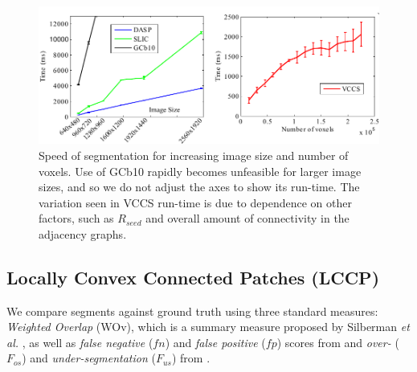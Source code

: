 \begin{figure}[t]
\begin{center}
\includegraphics[width=0.95\linewidth]{figures/CVPR2013/Speed.pdf}
\end{center}
   \caption[Segmentation Speed]{Speed of segmentation for increasing image size and number of voxels. Use of GCb10 rapidly becomes unfeasible for larger image sizes, and so we do not adjust the axes to show its run-time. The variation seen in VCCS run-time is due to dependence on other factors, such as ${R}_{seed}$ and overall amount of connectivity in the adjacency graphs.}
\label{fig:SegmentationSpeed}
\end{figure}

\subsection{Locally Convex Connected Patches (LCCP)}

We compare segments against ground truth using three standard measures: \textit{Weighted Overlap} (WOv), which is a summary measure proposed by Silberman \textit{et al.} \cite{Silberman:ECCV12}, as well as \textit{false negative} ($fn$) and \textit{false positive} ($fp$) scores from \cite{Ritter2012} and \textit{over-} ($F_{os}$) and \textit{under-segmentation} ($F_{us}$) from \cite{Richtsfeld:IROS12}.

